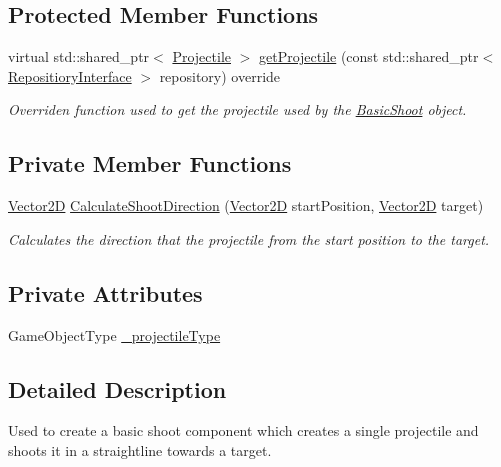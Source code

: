 \subsection*{Protected Member Functions}
\begin{DoxyCompactItemize}
\item 
virtual std\+::shared\+\_\+ptr$<$ \hyperlink{class_projectile}{Projectile} $>$ \hyperlink{class_basic_shoot_a2cad5133e2bcdc6441551387b3f2e873}{get\+Projectile} (const std\+::shared\+\_\+ptr$<$ \hyperlink{class_repositiory_interface}{Repositiory\+Interface} $>$ repository) override
\begin{DoxyCompactList}\small\item\em Overriden function used to get the projectile used by the \hyperlink{class_basic_shoot}{Basic\+Shoot} object. \end{DoxyCompactList}\end{DoxyCompactItemize}
\subsection*{Private Member Functions}
\begin{DoxyCompactItemize}
\item 
\hyperlink{class_vector2_d}{Vector2D} \hyperlink{class_basic_shoot_aafe1225544d200da3e0c084d33dac60a}{Calculate\+Shoot\+Direction} (\hyperlink{class_vector2_d}{Vector2D} start\+Position, \hyperlink{class_vector2_d}{Vector2D} target)
\begin{DoxyCompactList}\small\item\em Calculates the direction that the projectile from the start position to the target. \end{DoxyCompactList}\end{DoxyCompactItemize}
\subsection*{Private Attributes}
\begin{DoxyCompactItemize}
\item 
Game\+Object\+Type \hyperlink{class_basic_shoot_a3dfb89cab41f16d9bcb1e94f521978fe}{\+\_\+projectile\+Type}
\end{DoxyCompactItemize}


\subsection{Detailed Description}
Used to create a basic shoot component which creates a single projectile and shoots it in a straightline towards a target. 

